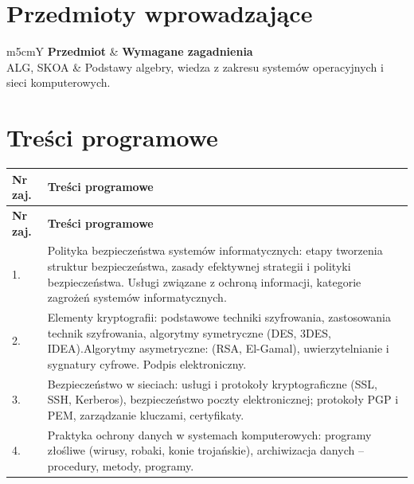 \documentclass[12pt, a4paper]{article}
\newcommand{\thdrule}{\noalign{\global\setlength{\extrarowheight}{0pt}}}
\newcommand{\thdend}{\noalign{\global\setlength{\extrarowheight}{3pt}}}
\begin{document}
\section{Przedmioty wprowadzające}

{\scriptsize
\begin{tabularx}{\textwidth}{m{5cm}Y}
\thdrule\toprule
{} {\color{white}\textbf{Przedmiot}} & {\color{white}\textbf{Wymagane zagadnienia}} \\
\midrule\thdend
   ALG, SKOA & Podstawy algebry, wiedza z zakresu systemów operacyjnych i sieci komputerowych. \\
\bottomrule
\end{tabularx}}

\section{Treści programowe}

{\scriptsize
\begin{longtable}{m{1.5cm}m{14.5cm}}
\thdrule\toprule
\rowcolor{pjatkRed} {\color{white}\textbf{Nr zaj.}} & {\color{white}\textbf{Treści programowe}} \\
\midrule\thdend
\endfirsthead
\thdrule\toprule
\rowcolor{pjatkRed} {\color{white}\textbf{Nr zaj.}} & {\color{white}\textbf{Treści programowe}} \\
\midrule\thdend
\endhead
  \rowcolor{tableRowLight} 1. & Polityka bezpieczeństwa systemów informatycznych: etapy tworzenia struktur bezpieczeństwa, zasady efektywnej strategii i polityki bezpieczeństwa. Usługi związane z ochroną informacji, kategorie zagrożeń systemów informatycznych. \\
  \rowcolor{tableRowAlt} 2. & Elementy kryptografii: podstawowe techniki szyfrowania, zastosowania technik szyfrowania, algorytmy symetryczne (DES, 3DES, IDEA).Algorytmy asymetryczne: (RSA, El-Gamal), uwierzytelnianie i sygnatury cyfrowe. Podpis elektroniczny. \\
  \rowcolor{tableRowLight} 3. & Bezpieczeństwo w sieciach: usługi i protokoły kryptograficzne (SSL, SSH, Kerberos), bezpieczeństwo poczty elektronicznej; protokoły PGP i PEM, zarządzanie kluczami, certyfikaty. \\
  \rowcolor{tableRowAlt} 4. & Praktyka ochrony danych w systemach komputerowych: programy złośliwe (wirusy, robaki, konie trojańskie), archiwizacja danych – procedury, metody, programy. \\
\bottomrule
\end{longtable}}
\end{document}
